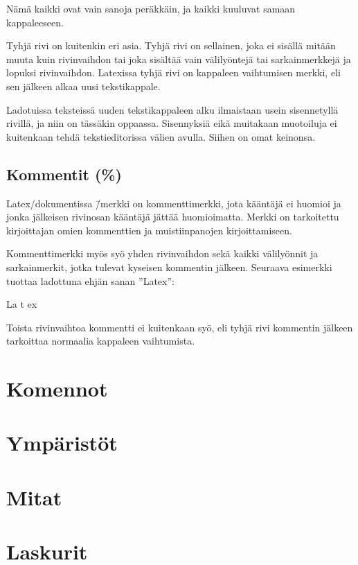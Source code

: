 \begin{koodilohkosis}
  Nämä      kaikki
       ovat        vain
  sanoja  peräkkäin,  ja      kaikki                    kuuluvat
      samaan kappaleeseen.     
\end{koodilohkosis}

Tyhjä rivi on kuitenkin eri asia. Tyhjä rivi on sellainen, joka ei
sisällä mitään muuta kuin rivinvaihdon tai joka sisältää vain
välilyöntejä tai sarkainmerkkejä ja lopuksi rivinvaihdon. Latexissa
tyhjä rivi on kappaleen vaihtumisen merkki, eli sen jälkeen alkaa uusi
tekstikappale.

Ladotuissa teksteissä uuden tekstikappaleen alku ilmaistaan usein
sisennetyllä rivillä, ja niin on tässäkin oppaassa. Sisennyksiä eikä
muitakaan muotoiluja ei kuitenkaan tehdä tekstieditorissa välien avulla.
Siihen on omat keinonsa.

\subsection{Kommentit (\%)}

Latex\-/dokumentissa \koodi{\%}\=/merkki on kommenttimerkki, jota
kääntäjä ei huomioi ja jonka jälkeisen rivin\-osan kääntäjä jättää
huomioimatta. Merkki on tarkoitettu kirjoittajan omien kommenttien ja
muistiinpanojen kirjoittamiseen.

Kommenttimerkki myös syö yhden rivinvaihdon sekä kaikki välilyönnit ja
sarkainmerkit, jotka tulevat kyseisen kommentin jälkeen. Seuraava
esimerkki tuottaa ladottuna ehjän sanan ''Latex'':

\begin{koodilohkosis}
  La%
   t%
    ex
\end{koodilohkosis}

Toista rivinvaihtoa kommentti ei kuitenkaan syö, eli tyhjä rivi
kommentin jälkeen tarkoittaa normaalia kappaleen vaihtumista.

\section{Komennot}
\section{Ympäristöt}
\section{Mitat}
\section{Laskurit}
